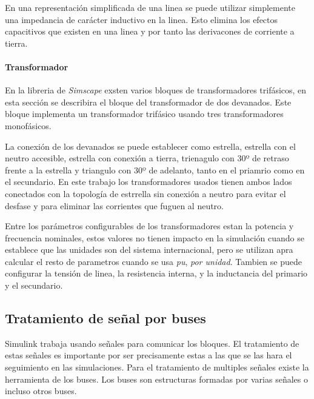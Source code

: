 \documentclass{book}
\begin{document}
En una representaci\'on simplificada de una linea se puede utilizar simplemente una impedancia de car\'acter inductivo en la linea. Esto elimina los efectos capacitivos que existen en una linea y por tanto las derivacones de corriente a tierra. \par 

		\paragraph{Transformador}

En la libreria de \emph{Simscape} exsten varios bloques de transformadores trif\'asicos, en esta secci\'on se describira el bloque del transformador de dos devanados. Este bloque implementa un transformador trif\'asico usando tres transformadores monof\'asicos. \par

La conexi\'on de los devanados se puede establecer como estrella, estrella con el neutro accesible, estrella con conexi\'on a tierra, trienagulo con 30º de retraso frente a la estrella y triangulo con 30º de adelanto,  tanto en el priamrio como en el secundario. En este trabajo los transformadores usados tienen ambos lados conectados con la topolog\'ia de estrrella sin conexi\'on a neutro para evitar el desfase y para eliminar las corrientes que fuguen al neutro. \par

Entre los par\'ametros configurables de los transformadores estan la potencia y frecuencia nominales, estos valores no tienen impacto en la simulaci\'on cuando se establece que las unidades son del sistema internacional, pero se utilizan apra calcular el resto de parametros cuando se usa \emph{pu}, \emph{por unidad}. Tambien se puede configurar la tensi\'on de linea, la resistencia interna, y la inductancia del primario y el secundario. \par

		\subsection{Tratamiento de señal por buses}

Simulink trabaja usando señales para comunicar los bloques. El tratamiento de estas señales es importante por ser precisamente estas a las que se las hara el seguimiento en las simulaciones. Para el tratamiento de multiples señales existe la herramienta de los buses. Los buses son estructuras formadas por varias señales o incluso otros buses. \par
\end{document}
